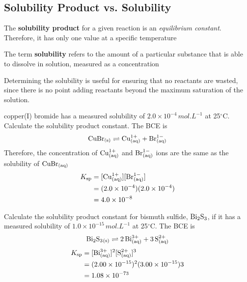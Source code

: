 \subsection{Solubility Product vs. Solubility}
\begin{bulleted-list}
    \item The \textbf{solubility product} for a given reaction is an \textit{equilibrium constant}.
        Therefore, it has only one value at a specific temperature
    \item The term \textbf{solubility} refers to the amount of a particular substance that is
        able to dissolve in solution, measured as a concentration
\end{bulleted-list}

\begin{important}
    Determining the solubility is useful for ensuring that no reactants are wasted, since there
    is no point adding reactants beyond the maximum saturation of the solution.
\end{important}

\begin{sample}{copper(I) bromide has a measured solubility of $2.0\times10^{-4}\,\si{mol.L^{-1}}$
    at 25$^{\circ}$C. Calculate the solubility product constant.}
    The BCE is
    \[
        \ch{CuBr_{(s)}}\rightleftharpoons \ch{Cu^{1+}_{(aq)}}+\ch{Br^{1-}_{(aq)}}
    \]
    Therefore, the concentration of $\ch{Cu^{1+}_{(aq)}}$ and $\ch{Br^{1-}_{(aq)}}$ ions
    are the same as the solubility of $\ch{CuBr_{(aq)}}$
    \begin{align*}
        K_\mathrm{sp}&=[\ch{Cu^{1+}_{(aq)}}][\ch{Br^{1-}_{(aq)}}]\\
                     &=(2.0\times10^{-4})(2.0\times10^{-4})\\
                     &=4.0\times10^{-8}
    \end{align*}
\end{sample}

\begin{sample}{Calculate the solubility product constant for bismuth sulfide, $\ch{Bi2S3}$, if it
    has a measured solubility of $1.0\times10^{-15}\,\si{mol.L^{-1}}$ at 25$^{\circ}$C.}
    The BCE is
    \[
        \ch{Bi2S3_{(s)}}\rightleftharpoons \ch{2Bi^{3+}_{(aq)}}+\ch{3S^{2+}_{(aq)}}
    \]
    \begin{align*}
        K_\mathrm{sp}&=[\ch{Bi^{3+}_{(aq)}}]^2[\ch{S^{2+}_{(aq)}}]^3\\
                     &=(2.00\times10^{-15})^2(3.00\times10^{-15})3\\
                     &=1.08\times10^{-73}
    \end{align*}
\end{sample}

